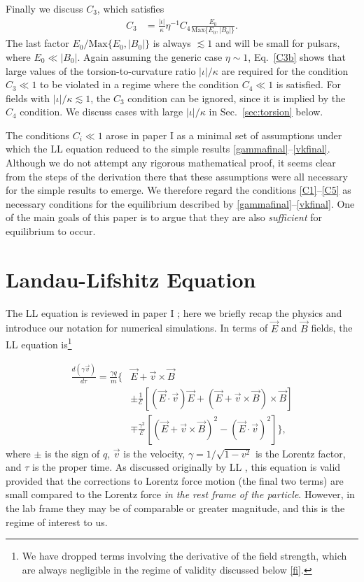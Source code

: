 \documentclass[amsmath,amssymb,nofootinbib,notitlepage,superscriptaddress,twocolumn]{revtex4-2}
\begin{document}
Finally we discuss $C_3$, which satisfies
\begin{align}\label{C3b}
    C_3 & = \frac{|\iota|}{\kappa} \eta^{-1} C_4 \frac{E_0}{\textrm{Max}\{E_0,|B_0|\}}.
\end{align}
The last factor $E_0/\textrm{Max}\{E_0,|B_0|\}$ is always $\lesssim 1$ and will be small for pulsars, where $E_0 \ll |B_0|$.  Again assuming the generic case $\eta \sim 1$, Eq.~\eqref{C3b} shows that large values of the torsion-to-curvature ratio $|\iota|/\kappa$ are required for the condition $C_3 \ll 1$ to be violated in a regime where the condition $C_4 \ll 1$ is satisfied.  For fields with $|\iota|/\kappa \lesssim 1$, the $C_3$ condition can be ignored, since it is implied by the $C_4$ condition.  We discuss cases with large $|\iota|/\kappa$ in Sec.~\ref{sec:torsion} below.

The conditions $C_i \ll 1$ arose in paper I as a minimal set of assumptions under which the LL equation reduced to the simple results \eqref{gammafinal}--\eqref{vkfinal}.  Although we do not attempt any rigorous mathematical proof, it seems clear from the steps of the derivation there that these assumptions were all necessary for the simple results to emerge.  We therefore regard the conditions \eqref{C1}--\eqref{C5} as necessary conditions for the equilibrium described by \eqref{gammafinal}--\eqref{vkfinal}.  One of the main goals of this paper is to argue that they are also \textit{sufficient} for equilibrium to occur. 

\section{Landau-Lifshitz Equation}\label{sec:numerical}
The LL equation is reviewed in paper I \cite{Cai:2022mkw}; here we briefly recap the physics and introduce our notation for numerical simulations.  
In terms of $\vec{E}$ and $\vec{B}$ fields, the LL equation is\footnote{We have dropped terms involving the derivative of the field strength, which are always negligible in the regime of validity discussed below \eqref{fi}.}

\begin{align}
    \frac{d(\gamma\Vec{v})}{d\tau} = \frac{\gamma q}{m}\Bigg\{& \Vec{E}+\Vec{v}\times\Vec{B} \nonumber \\ 
    & \pm\frac{1}{\mathcal{E}}\left[(\Vec{E}\cdot\Vec{v})\Vec{E}+(\Vec{E}+\Vec{v}\times\Vec{B})\times\Vec{B}\right] \nonumber \\
    & \mp\frac{\gamma^2}{\mathcal{E}}\left[(\Vec{E}+\Vec{v}\times\Vec{B})^2-(\Vec{E}\cdot\Vec{v})^2\right]\Bigg\}, \label{fi}
\end{align}
where $\pm$ is the sign of $q$, $\vec{v}$ is the velocity, $\gamma=1/\sqrt{1-v^2}$ is the Lorentz factor, and $\tau$ is the proper time.  As discussed originally by LL \cite{LL}, this equation is valid provided that the corrections to Lorentz force motion (the final two terms) are small compared to the Lorentz force \textit{in the rest frame of the particle}.  However, in the lab frame they may be of comparable or greater magnitude, and this is the regime of interest to us.
\end{document}
